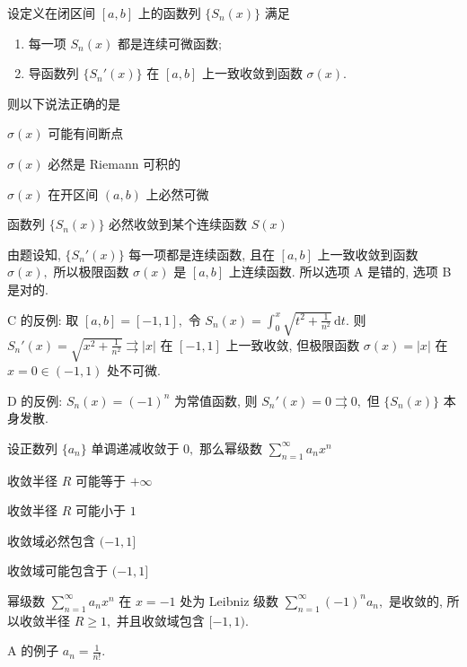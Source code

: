 \begin{question}
设定义在闭区间 $[a, b]$ 上的函数列 $\{ S_n(x) \}$ 满足
\begin{enumerate}
\item 每一项 $S_n(x)$ 都是连续可微函数;
\item 导函数列 $\{ S_n'(x) \}$ 在 $[a, b]$ 上一致收敛到函数 $\sigma(x).$
\end{enumerate}
则以下说法正确的是 \paren[B]

\begin{choices}
\item $\sigma(x)$ 可能有间断点
\item $\sigma(x)$ 必然是 Riemann 可积的
\item $\sigma(x)$ 在开区间 $(a, b)$ 上必然可微
\item 函数列 $\{ S_n(x) \}$ 必然收敛到某个连续函数 $S(x)$
\end{choices}
\end{question}

\begin{solution}
由题设知, $\{ S_n'(x) \}$ 每一项都是连续函数, 且在 $[a, b]$ 上一致收敛到函数 $\sigma(x),$ 所以极限函数 $\sigma(x)$ 是 $[a, b]$ 上连续函数. 所以选项 A 是错的, 选项 B 是对的.

C 的反例: 取 $[a, b] = [-1, 1],$ 令 $S_n(x) = \displaystyle\int_0^x \sqrt{t^2 + \frac{1}{n^2}} \, \mathrm{d}t.$ 则 $S_n'(x) = \sqrt{x^2 + \frac{1}{n^2}} \rightrightarrows |x|$ 在 $[-1, 1]$ 上一致收敛, 但极限函数 $\sigma(x) = |x|$ 在 $x = 0 \in (-1, 1)$ 处不可微.

D 的反例: $S_n(x) = (-1)^n$ 为常值函数, 则 $S_n'(x) = 0 \rightrightarrows 0,$ 但 $\{ S_n(x) \}$ 本身发散.
\end{solution}

\begin{question}
设正数列 $\{ a_n \}$ 单调递减收敛于 $0,$ 那么幂级数 $\sum_{n=1}^\infty a_n x^n$ \paren[A]

\begin{choices}
\item 收敛半径 $R$ 可能等于 $+\infty$
\item 收敛半径 $R$ 可能小于 $1$
\item 收敛域必然包含 $(-1, 1]$
\item 收敛域可能包含于 $(-1, 1]$
\end{choices}
\end{question}

\begin{solution}
幂级数 $\sum_{n=1}^\infty a_n x^n$ 在 $x = -1$ 处为 Leibniz 级数 $\sum_{n=1}^\infty (-1)^n a_n,$ 是收敛的, 所以收敛半径 $R \geqslant 1,$ 并且收敛域包含 $[-1, 1).$

A 的例子 $a_n = \frac{1}{n!}.$
\end{solution}

